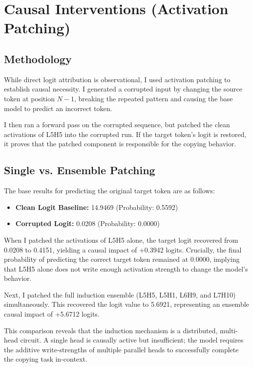 \documentclass[11pt]{article}
\begin{document}
\section{Causal Interventions (Activation Patching)}

\subsection{Methodology}

While direct logit attribution is observational, I used activation patching to establish causal necessity. I generated a corrupted input by changing the source token at position $N-1$, breaking the repeated pattern and causing the base model to predict an incorrect token. 

I then ran a forward pass on the corrupted sequence, but patched the clean activations of L5H5 into the corrupted run. If the target token's logit is restored, it proves that the patched component is responsible for the copying behavior.

\subsection{Single vs. Ensemble Patching}

The base results for predicting the original target token are as follows:
\begin{itemize}
    \item \textbf{Clean Logit Baseline:} 14.9469 (Probability: 0.5592)
    \item \textbf{Corrupted Logit:} 0.0208 (Probability: 0.0000)
\end{itemize}

When I patched the activations of L5H5 alone, the target logit recovered from 0.0208 to 0.4151, yielding a causal impact of +0.3942 logits. Crucially, the final probability of predicting the correct target token remained at 0.0000, implying that L5H5 alone does not write enough activation strength to change the model's behavior.

Next, I patched the full induction ensemble (L5H5, L5H1, L6H9, and L7H10) simultaneously. This recovered the logit value to 5.6921, representing an ensemble causal impact of +5.6712 logits. 

This comparison reveals that the induction mechanism is a distributed, multi-head circuit. A single head is causally active but insufficient; the model requires the additive write-strengths of multiple parallel heads to successfully complete the copying task in-context.
\end{document}
